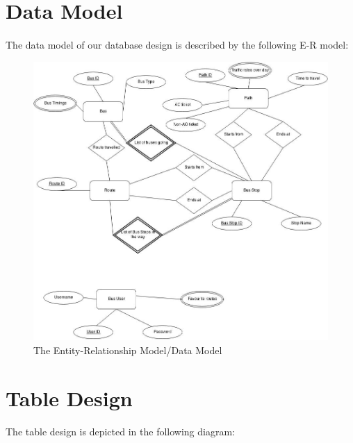 \documentclass[11pt]{article}
\begin{document}
\pagebreak{}
\section{Data Model}
\paragraph{}
The data model of our database design is described by the following E-R model:

\begin{figure}[ht!]
\center
\includegraphics[width=150mm]{shots/er.jpg}
\caption{The Entity-Relationship Model/Data Model}
\label{overflow}
\end{figure}

\pagebreak{}

\section{Table Design}
\paragraph{}
The table design is depicted in the following diagram:
\end{document}
